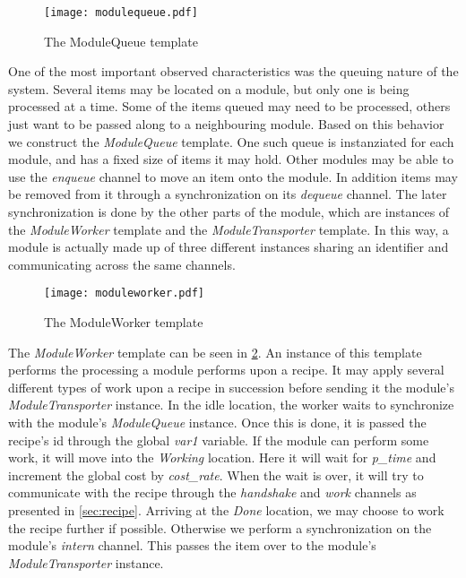 \begin{figure}[h]
\centering
\texttt{[image: modulequeue.pdf]}
\caption{The ModuleQueue template}
\label{fig:modulequeue}
\end{figure}

One of the most important observed characteristics was the queuing nature of the system. Several items may be located on a module, but only one is being processed at a time. Some of the items queued may need to be processed, others just want to be passed along to a neighbouring module. Based on this behavior we construct the \emph{ModuleQueue} template. One such queue is instanziated for each module, and has a fixed size of items it may hold. Other modules may be able to use the \emph{enqueue} channel to move an item onto the module. In addition items may be removed from it through a synchronization on its \emph{dequeue} channel. The later synchronization is done by the other parts of the module, which are instances of the \emph{ModuleWorker} template and the \emph{ModuleTransporter} template. In this way, a module is actually made up of three different instances sharing an identifier and communicating across the same channels.    


\begin{figure}[h]
\centering
\texttt{[image: moduleworker.pdf]}
\caption{The ModuleWorker template}
\label{fig:moduleworker}
\end{figure}

The \emph{ModuleWorker} template can be seen in \cref{fig:moduleworker}. An instance of this template performs the processing a module performs upon a recipe. It may apply several different types of work upon a recipe in succession before sending it the module's \emph{ModuleTransporter} instance. In the idle location, the worker waits to synchronize with the module's \emph{ModuleQueue} instance. Once this is done, it is passed the recipe's id through the global \emph{var1} variable. If the module can perform some work, it will move into the \emph{Working} location. Here it will wait for \emph{p\_time} and increment the global cost by \emph{cost\_rate}. When the wait is over, it will try to communicate with the recipe through the \emph{handshake} and \emph{work} channels as presented in \cref{sec:recipe}. Arriving at the \emph{Done} location, we may choose to work the recipe further if possible. Otherwise we perform a synchronization on the module's \emph{intern} channel. This passes the item over to the module's \emph{ModuleTransporter} instance.

